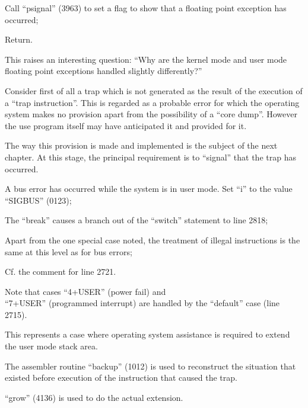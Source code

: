 \bd
\item[2793:] Call ``psignal'' (3963) to set a
 flag to show that a floating
 point exception has occurred;

\item[2794:] Return.
\ed

This raises an interesting question: ``Why are the kernel mode
and user mode floating point
exceptions handled slightly differently?''



Consider first of all a trap which is
not generated as the result of the execution of a ``trap instruction''. This
is regarded as a probable error for
which the operating system makes no
provision apart from the possibility of
a ``core dump''. However the use program
itself may have anticipated it and provided for it.

The way this provision is made and
implemented is the subject of the next
chapter. At this stage, the principal
requirement is to ``signal'' that the
trap has occurred.

\bd
\item[2721:] A bus error has occurred while
 the system is in user mode. Set
 ``i'' to the value ``SIGBUS'' (0123);

\item[2723:] The ``break'' causes a branch out
 of the ``switch'' statement to line
 2818;

\item[2733:] Apart from the one special case
noted, the treatment of illegal
instructions is the same at this
level as for bus errors;

\item[2739:]
\item[2743:]
\item[2747:]
\item[2796:] Cf. the comment for line 2721.
\ed


Note that cases ``4+USER'' (power fail)
and\\
``7+USER'' (programmed interrupt) are
handled by the ``default'' case (line
2715).

\bd
\item[2810:] This represents a case where
 operating system assistance is
 required to extend the user mode
 stack area.

The assembler routine ``backup''
(1012) is used to reconstruct the
situation that existed before
execution of the instruction that
caused the trap.

``grow'' (4136) is used to do the
actual extension.
\ed

